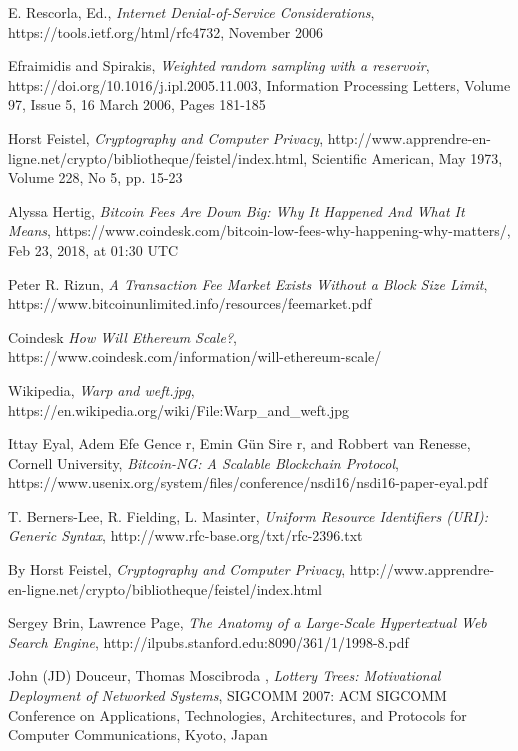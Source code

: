 \documentclass{article}
\begin{document}
\begin{thebibliography}{1}
    E.  Rescorla, Ed.,
    \textit{Internet Denial-of-Service Considerations},
    https://tools.ietf.org/html/rfc4732,
    November 2006

    Efraimidis and Spirakis,
    \textit{Weighted random sampling with a reservoir},
    https://doi.org/10.1016/j.ipl.2005.11.003,
    Information Processing Letters,
    Volume 97, Issue 5, 16 March 2006, Pages 181-185

    Horst Feistel,
    \textit{Cryptography and Computer Privacy},
    http://www.apprendre-en-ligne.net/crypto/bibliotheque/feistel/index.html,
    Scientific American, May 1973, Volume 228, No 5, pp.  15-23

    Alyssa Hertig,
    \textit{Bitcoin Fees Are Down Big: Why It Happened And What It Means},
    https://www.coindesk.com/bitcoin-low-fees-why-happening-why-matters/,
    Feb 23, 2018, at 01:30 UTC

    Peter R.  Rizun,
    \textit{A Transaction Fee Market Exists Without a Block Size Limit},
    https://www.bitcoinunlimited.info/resources/feemarket.pdf

    Coindesk
    \textit{How Will Ethereum Scale?},
    https://www.coindesk.com/information/will-ethereum-scale/

    Wikipedia,
    \textit{Warp and weft.jpg},
    https://en.wikipedia.org/wiki/File:Warp\_and\_weft.jpg

    Ittay Eyal, Adem Efe Gence r, Emin Gün Sire r, and Robbert van Renesse, Cornell University,
    \textit{Bitcoin-NG: A Scalable Blockchain Protocol},
    https://www.usenix.org/system/files/conference/nsdi16/nsdi16-paper-eyal.pdf

    T.  Berners-Lee, R.  Fielding, L.  Masinter,
    \textit{Uniform Resource Identifiers (URI): Generic Syntax},
    http://www.rfc-base.org/txt/rfc-2396.txt

    By Horst Feistel,
    \textit{Cryptography and Computer Privacy},
    http://www.apprendre-en-ligne.net/crypto/bibliotheque/feistel/index.html

    Sergey Brin, Lawrence Page,
    \textit{The Anatomy of a Large-Scale Hypertextual
Web Search Engine},
    http://ilpubs.stanford.edu:8090/361/1/1998-8.pdf

     John (JD) Douceur, Thomas Moscibroda ,
    \textit{Lottery Trees: Motivational Deployment of Networked Systems},
    SIGCOMM 2007: ACM SIGCOMM Conference on Applications, Technologies,
    Architectures, and Protocols for Computer Communications, Kyoto, Japan 

\end{thebibliography}
\end{document}
